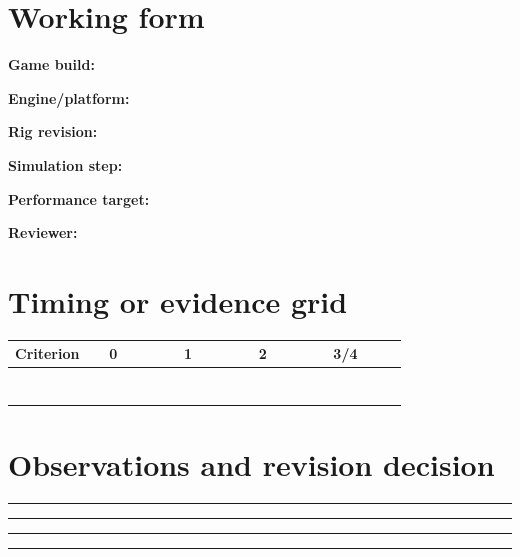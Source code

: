 \documentclass[10pt,letterpaper]{article}
\begin{document}
\section{Working form}
\noindent\textbf{Game build:}\quad\hrulefill\par\vspace{10pt}
\noindent\textbf{Engine/platform:}\quad\hrulefill\par\vspace{10pt}
\noindent\textbf{Rig revision:}\quad\hrulefill\par\vspace{10pt}
\noindent\textbf{Simulation step:}\quad\hrulefill\par\vspace{10pt}
\noindent\textbf{Performance target:}\quad\hrulefill\par\vspace{10pt}
\noindent\textbf{Reviewer:}\quad\hrulefill\par\vspace{10pt}\section{Timing or evidence grid}
\begin{longtable}{|p{0.156\linewidth}|p{0.156\linewidth}|p{0.156\linewidth}|p{0.156\linewidth}|p{0.156\linewidth}|}
\hline
\textbf{Criterion} & \textbf{0} & \textbf{1} & \textbf{2} & \textbf{3/4}\\\hline
\endhead
\rule{0pt}{20pt} &  &  &  & \\\hline
\rule{0pt}{20pt} &  &  &  & \\\hline
\rule{0pt}{20pt} &  &  &  & \\\hline
\rule{0pt}{20pt} &  &  &  & \\\hline
\rule{0pt}{20pt} &  &  &  & \\\hline
\rule{0pt}{20pt} &  &  &  & \\\hline
\rule{0pt}{20pt} &  &  &  & \\\hline
\end{longtable}
\section{Observations and revision decision}
\noindent\rule{\linewidth}{0.4pt}\par\vspace{18pt}\noindent\rule{\linewidth}{0.4pt}\par\vspace{18pt}\noindent\rule{\linewidth}{0.4pt}\par\vspace{18pt}\noindent\rule{\linewidth}{0.4pt}\par\vspace{18pt}
\end{document}
